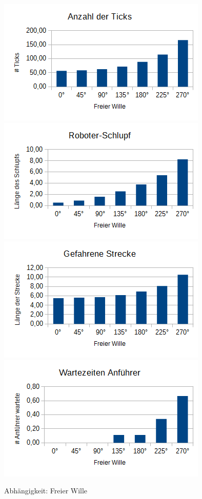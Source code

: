 \begin{figure}[h]
	\includegraphics[width=\sectionTransportPictureWidth , keepaspectratio]{graphics/Statistics/Transport/Angle_Observations.png}
	\includegraphics[width=\sectionTransportPictureWidth , keepaspectratio]{graphics/Statistics/Transport/Angle_Slack.png}
	\includegraphics[width=\sectionTransportPictureWidth , keepaspectratio]{graphics/Statistics/Transport/Angle_Way.png}
	\includegraphics[width=\sectionTransportPictureWidth , keepaspectratio]{graphics/Statistics/Transport/Angle_Move.png}
	\caption{Abhängigkeit: Freier Wille}
	\label{pic:TransportAngle}
\end{figure}

